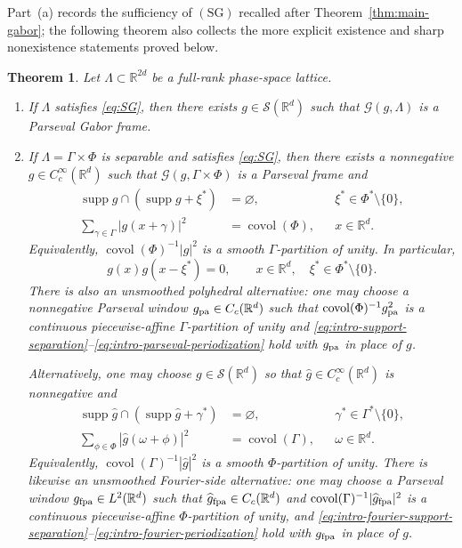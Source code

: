 \documentclass[11pt,reqno]{amsart}
\numberwithin{equation}{section}
\newtheorem{theorem}{Theorem}[section]
\theoremstyle{definition}
\theoremstyle{remark}
\newcommand{\R}{\mathbb R}
\newcommand{\covol}{\operatorname{covol}}
\newcommand{\supp}{\operatorname{supp}}
\newcommand{\G}{\mathcal G}
\newcommand{\Sclass}{\mathcal S}
\newcommand{\SG}{\ensuremath{(\mathrm{SG})}\xspace}
\begin{document}
Part~(a) records the sufficiency of \SG recalled after
Theorem~\ref{thm:main-gabor}; the following theorem also collects the more
explicit existence and sharp nonexistence statements proved below.

\begin{theorem}
\label{thm:strengthened-one-window}
Let $\Lambda\subset\R^{2d}$ be a full-rank phase-space lattice.
\begin{enumerate}[label=(\alph*)]
\item If $\Lambda$ satisfies \eqref{eq:SG}, then there exists $g\in\Sclass(\R^d)$ such that $\G(g,\Lambda)$ is a
Parseval Gabor frame.

\item If $\Lambda=\Gamma\times\Phi$ is separable and satisfies
\eqref{eq:SG}, then there exists a nonnegative $g\in C_c^\infty(\R^d)$ such that
$\G(g,\Gamma\times\Phi)$ is a Parseval frame and
\begin{align}
 \supp g\cap(\supp g+\xi^*)&=\varnothing,
 &&\xi^*\in\Phi^*\setminus\{0\},
 \label{eq:intro-support-separation}\\
 \sum_{\gamma\in\Gamma}|g(x+\gamma)|^2&=\covol(\Phi),
 &&x\in\R^d.
 \label{eq:intro-parseval-periodization}
\end{align}
Equivalently, $\covol(\Phi)^{-1}|g|^2$ is a smooth
$\Gamma$-partition of unity.  In particular,
\[
 g(x)g(x-\xi^*)=0,
 \qquad x\in\R^d,\quad \xi^*\in\Phi^*\setminus\{0\}.
\]
There is also an unsmoothed polyhedral alternative: one may choose a
nonnegative Parseval window $g_{\rm pa}\in C_c(\R^d)$ such that
$\covol(\Phi)^{-1}g_{\rm pa}^2$ is a continuous piecewise-affine
$\Gamma$-partition of unity and
\eqref{eq:intro-support-separation}--\eqref{eq:intro-parseval-periodization}
hold with $g_{\rm pa}$ in place of $g$.

Alternatively, one may choose $g\in\Sclass(\R^d)$ so that
$\widehat g\in C_c^\infty(\R^d)$ is nonnegative and
\begin{align}
 \supp\widehat g\cap(\supp\widehat g+\gamma^*)&=\varnothing,
 &&\gamma^*\in\Gamma^*\setminus\{0\},
 \label{eq:intro-fourier-support-separation}\\
 \sum_{\phi\in\Phi}|\widehat g(\omega+\phi)|^2&=\covol(\Gamma),
 &&\omega\in\R^d.
 \label{eq:intro-fourier-periodization}
\end{align}
Equivalently, $\covol(\Gamma)^{-1}|\widehat g|^2$ is a smooth
$\Phi$-partition of unity.
There is likewise an unsmoothed Fourier-side alternative: one may choose
a Parseval window $g_{\rm fpa}\in L^2(\R^d)$ such that
$\widehat g_{\rm fpa}\in C_c(\R^d)$ and
$\covol(\Gamma)^{-1}|\widehat g_{\rm fpa}|^2$ is a continuous
piecewise-affine $\Phi$-partition of unity, and
\eqref{eq:intro-fourier-support-separation}--\eqref{eq:intro-fourier-periodization}
hold with $g_{\rm fpa}$ in place of $g$.


\end{enumerate}
\end{theorem}
\end{document}
